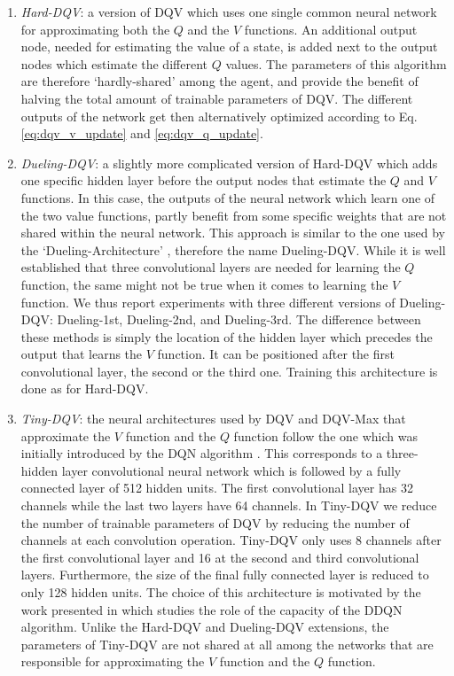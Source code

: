 \begin{enumerate}
    \item \textit{Hard-DQV}: a version of DQV which uses one single common neural network for approximating both the $Q$ and the $V$ functions. An additional output node, needed for estimating the value of a state, is added next to the output nodes which estimate the different $Q$ values. The parameters of this algorithm are therefore `hardly-shared' among the agent, and provide the benefit of halving the total amount of trainable parameters of DQV. The different outputs of the network get then alternatively optimized according to Eq. \ref{eq:dqv_v_update} and \ref{eq:dqv_q_update}.

    \item \textit{Dueling-DQV}: a slightly more complicated version of Hard-DQV which adds one specific hidden layer before the output nodes that estimate the $Q$ and $V$ functions. In this case, the outputs of the neural network which learn one of the two value functions, partly benefit from some specific weights that are not shared within the neural network. This approach is similar to the one used by the `Dueling-Architecture' \cite{wang2016dueling}, therefore the name Dueling-DQV. While it is well established that three convolutional layers are needed \cite{mnih2015human, van2016deep} for learning the $Q$ function, the same might not be true when it comes to learning the $V$ function. We thus report experiments with three different versions of Dueling-DQV: Dueling-1st, Dueling-2nd, and Dueling-3rd. The difference between these methods is simply the location of the hidden layer which precedes the output that learns the $V$ function. It can be positioned after the first convolutional layer, the second or the third one. Training this architecture is done as for Hard-DQV.

    \item \textit{Tiny-DQV}: the neural architectures used by DQV and DQV-Max that approximate the $V$ function and the $Q$ function follow the one which was initially introduced by the DQN algorithm \cite{mnih2015human}. This corresponds to a three-hidden layer convolutional neural network which is followed by a fully connected layer of 512 hidden units. The first convolutional layer has 32 channels while the last two layers have 64 channels. In Tiny-DQV we reduce the number of trainable parameters of DQV by reducing the number of channels at each convolution operation. Tiny-DQV only uses 8 channels after the first convolutional layer and 16 at the second and third convolutional layers. Furthermore, the size of the final fully connected layer is reduced to only 128 hidden units. The choice of this architecture is motivated by the work presented in \cite{van2018deep} which studies the role of the capacity of the DDQN algorithm. Unlike the Hard-DQV and Dueling-DQV extensions, the parameters of Tiny-DQV are not shared at all among the networks that are responsible for approximating the $V$ function and the $Q$ function.
\end{enumerate}

